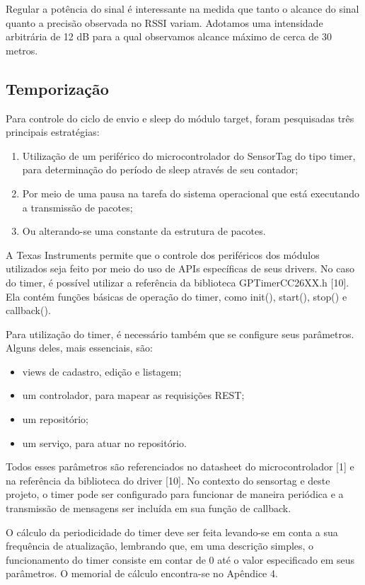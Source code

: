 Regular a potência do sinal é interessante na medida que tanto o alcance do sinal quanto a precisão observada no RSSI variam. Adotamos uma intensidade arbitrária de 12 dB para a qual observamos alcance máximo de cerca de 30 metros.

\subsection{Temporização}

Para controle do ciclo de envio e sleep do módulo target, foram pesquisadas três principais estratégias:

\begin{enumerate}
  \item Utilização de um periférico do microcontrolador do SensorTag do tipo timer, para determinação do período de sleep através de seu contador;
  \item Por meio de uma pausa na tarefa do sistema operacional que está executando a transmissão de pacotes;
  \item Ou alterando-se uma constante da estrutura de pacotes.
\end{enumerate}

A Texas Instruments permite que o controle dos periféricos dos módulos utilizados seja feito por meio do uso de APIs específicas de seus drivers. No caso do timer, é possível utilizar a referência da biblioteca GPTimerCC26XX.h [10]. Ela contém funções básicas de operação do timer, como init(), start(), stop() e callback().

Para utilização do timer, é necessário também que se configure seus parâmetros. Alguns deles, mais essenciais, são:

\begin{itemize}
	\item views de cadastro, edição e listagem;
	\item um controlador, para mapear as requisições REST;
	\item um repositório;
	\item um serviço, para atuar no repositório.
\end{itemize}

Todos esses parâmetros são referenciados no datasheet do microcontrolador [1] e na referência da biblioteca do driver [10]. No contexto do sensortag e deste projeto, o timer pode ser configurado para funcionar de maneira periódica e a transmissão de mensagens ser incluída em sua função de callback.

O cálculo da periodicidade do timer deve ser feita levando-se em conta a sua frequência de atualização, lembrando que, em uma descrição simples, o funcionamento do timer consiste em contar de 0 até o valor especificado em seus parâmetros. O memorial de cálculo encontra-se no Apêndice 4.

